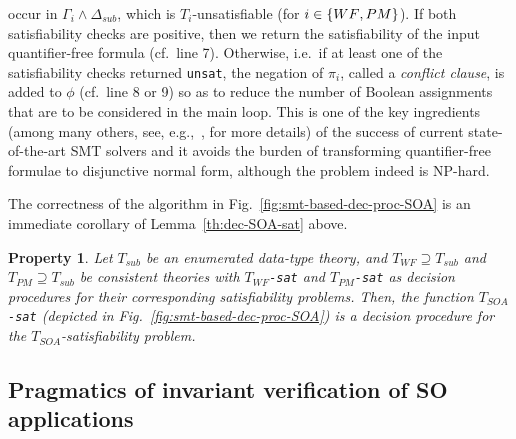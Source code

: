 \documentclass[conference]{IEEEtran}
\newtheorem{property}{Property}
\begin{document}
\begin{LONG}
occur in $\Gamma_i\wedge \Delta_\mathit{sub}$, which is $T_i$-unsatisfiable
(for $i\in \{\mathit\mathit{WF}, \mathit\mathit{PM}\}$).  If both satisfiability
checks are positive, then we return the satisfiability of the input
quantifier-free formula (cf.\ line 7).  Otherwise, i.e.\ if at least
one of the satisfiability checks returned \texttt{unsat}, the negation
of $\pi_i$, called a \emph{conflict clause}, is added to $\phi$ (cf.\
line 8 or 9) so as to reduce the number of Boolean assignments that
are to be considered in the main loop.  This is one of the key
ingredients (among many others, see, e.g.,~\cite{sebastiani}, for more
details) of the success of current state-of-the-art SMT solvers and it
avoids the burden of transforming quantifier-free formulae to
disjunctive normal form, although the problem indeed is NP-hard.

The correctness of the algorithm in
Fig.~\ref{fig:smt-based-dec-proc-SOA} is an immediate corollary of
Lemma~\ref{th:dec-SOA-sat} above.
\begin{property}
  Let $T_\mathit{sub}$ be an enumerated data-type theory, and $T_\mathit{WF} \supseteq
  T_\mathit{sub}$ and $T_\mathit{PM} \supseteq T_\mathit{sub}$ be consistent theories with
  $T_\mathit{WF}$\texttt{-sat} and $T_\mathit{PM}$\texttt{-sat} as decision
  procedures for their corresponding satisfiability problems.  Then,
  the function $T_\mathit{SOA}$\texttt{-sat} (depicted in
  Fig.~\ref{fig:smt-based-dec-proc-SOA}) is a decision procedure for
  the $T_\mathit{SOA}$-satisfiability problem.
\end{property}


\subsection{Pragmatics of invariant verification of SO applications}\label{sec:pragmatics-invariant}


\end{LONG}
\end{document}
